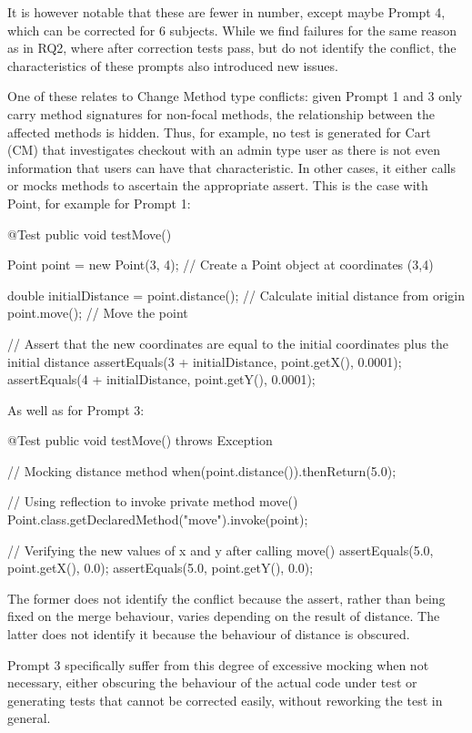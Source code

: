 It is however notable that these are fewer in number, except maybe Prompt 4, which can be corrected for 6 subjects.
While we find failures for the same reason as in RQ2, where after correction tests pass, but do not identify the conflict,
the characteristics of these prompts also introduced new issues.

One of these relates to Change Method type conflicts: given Prompt 1 and 3 only carry method signatures for non-focal methods,
the relationship between the affected methods is hidden. Thus, for example, no test is generated for Cart (CM) that investigates
checkout with an admin type user as there is not even information that users can have that characteristic. In other cases, it either
calls or mocks methods to ascertain the appropriate assert. This is the case with Point, for example for Prompt 1:
\begin{response}
    @Test
    public void testMove() {
        Point point = new Point(3, 4); // Create a Point object at coordinates (3,4)
        
        double initialDistance = point.distance(); // Calculate initial distance from origin
        point.move(); // Move the point
        
        // Assert that the new coordinates are equal to the initial coordinates plus the initial distance
        assertEquals(3 + initialDistance, point.getX(), 0.0001); 
        assertEquals(4 + initialDistance, point.getY(), 0.0001);
    }
\end{response}
As well as for Prompt 3:
\begin{response}
    @Test
    public void testMove() throws Exception {
        // Mocking distance method
        when(point.distance()).thenReturn(5.0);

        // Using reflection to invoke private method move()
        Point.class.getDeclaredMethod("move").invoke(point);

        // Verifying the new values of x and y after calling move()
        assertEquals(5.0, point.getX(), 0.0);
        assertEquals(5.0, point.getY(), 0.0);
    }
\end{response}
The former does not identify the conflict because the assert, rather than being fixed on the merge behaviour,
varies depending on the result of distance. The latter does not identify it because the behaviour of distance is 
obscured.

Prompt 3 specifically suffer from this degree of excessive mocking when not necessary, either obscuring the behaviour of 
the actual code under test or generating tests that cannot be corrected easily, without reworking the test in general.

